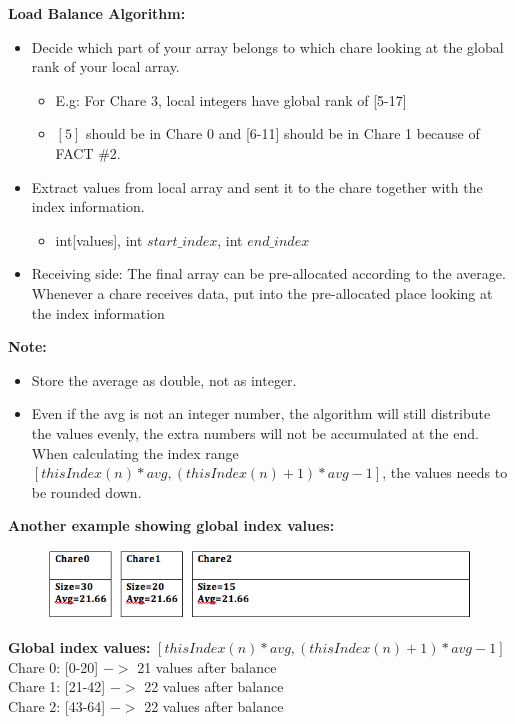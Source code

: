 \documentclass{article}
\begin{document}
\textbf{ Load Balance Algorithm: }
\begin{itemize}
\item Decide which part of your array belongs to which chare looking at the global rank of your local array.
\begin{itemize}
\item E.g: For Chare 3, local integers have global rank of [5-17]
\item $[5]$ should be in Chare 0 and [6-11] should be in Chare 1 because of FACT \#2.
\end{itemize}
\item Extract values from local array and sent it to the chare together with the index information. 
\begin{itemize}
\item int[values], int $start\_index$, int $end\_index$
\end{itemize}


\item Receiving side: The final array can be pre-allocated according to the average. Whenever a chare receives data, put into the pre-allocated place looking at the index information

\end{itemize}



\textbf{Note:}
\begin{itemize}
\item Store the average as double, not as integer.
\item Even if the avg is not an integer number, the algorithm will still distribute the values evenly, the extra numbers will not be accumulated at the end.
When calculating the index range $[thisIndex(n)*avg, (thisIndex(n)+1)*avg-1]$, the values needs to be rounded down.\\
\end{itemize}


\textbf{Another example showing global index values:}

\begin{figure}[h]
\centering
\includegraphics[width=\textwidth]{example.png}
\label{prefix}
\end{figure}
\textbf{Global index values:} $[thisIndex(n)*avg, (thisIndex(n)+1)*avg-1]$\\
Chare 0: [0-20] $->$ 21 values after balance\\
Chare 1: [21-42] $->$ 22 values after balance\\
Chare 2: [43-64] $->$ 22 values after balance\\
\end{document}
